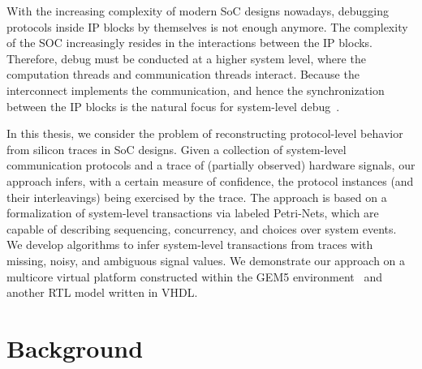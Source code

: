 \documentclass[12pt,frontmatter,copyright,thesis]{usfmanus}
\begin{document}
With the increasing complexity of modern SoC designs nowadays, 
debugging protocols inside IP
blocks by themselves is not enough anymore. The complexity
of the SOC increasingly resides in the interactions between
the IP blocks. 
Therefore, debug must be conducted
at a higher system level, where the computation threads
and communication threads interact.
 Because the interconnect
implements the communication, and hence the synchronization
between the IP blocks is the natural focus for system-level
debug~\cite{Goossens2007NOCS}.

In this thesis, we consider the problem of reconstructing
protocol-level behavior from silicon traces in SoC designs.
Given a collection of system-level communication protocols
and a trace of (partially observed) hardware signals, our
approach infers, with a certain measure of confidence, the
protocol instances (and their interleavings) being exercised
by the trace.  The approach is based on a formalization of
system-level transactions via labeled Petri-Nets, which are
capable of describing sequencing, concurrency, and choices
over system events.  We develop algorithms to infer
system-level transactions from traces with missing, noisy,
and ambiguous signal values.  We demonstrate our approach on
a multicore virtual platform constructed within the GEM5
environment~\cite{Binkert2011} and another RTL model written in VHDL.



\chapter{Background}
\end{document}
